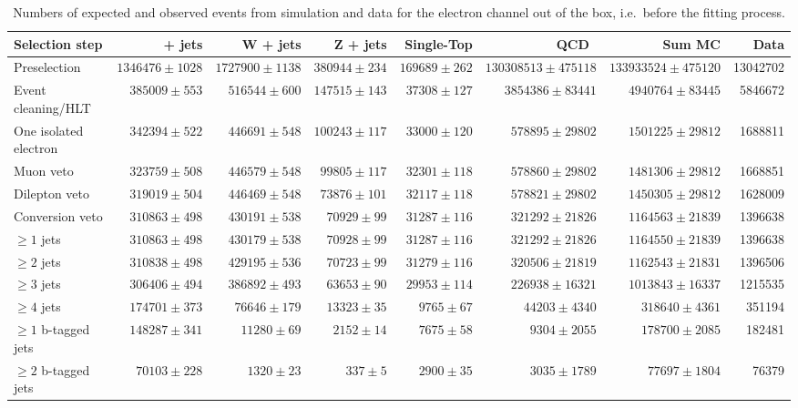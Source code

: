\begin{table}
  \centering
   \caption{Numbers of expected and observed events from simulation and data
   for the electron channel out of the box, i.e.\ before the fitting process.}
    \label{tab:event_yields_ejets}
    \resizebox{\columnwidth}{!} {
    \begin{tabular}{lrrrrrrr}
    \toprule
	Selection step & \ttbar + jets & W + jets & Z + jets & Single-Top & QCD~  & Sum MC & Data \\
	\midrule
	Preselection  &  $1346476 \pm 1028$ &  $1727900 \pm 1138$ &  $380944 \pm 234$ &  $169689 \pm 262$ &  $130308513 \pm 475118$ &  $133933524 \pm 475120$ &  13042702 \\ 
	Event cleaning/HLT  &  $385009 \pm 553$ &  $516544 \pm 600$ &  $147515 \pm 143$ &  $37308 \pm 127$ &  $3854386 \pm 83441$ &  $4940764 \pm 83445$ &  5846672 \\ 
	One isolated electron  &  $342394 \pm 522$ &  $446691 \pm 548$ &  $100243 \pm 117$ &  $33000 \pm 120$ &  $578895 \pm 29802$ &  $1501225 \pm 29812$ &  1688811 \\ 
	Muon veto  &  $323759 \pm 508$ &  $446579 \pm 548$ &  $99805 \pm 117$ &  $32301 \pm 118$ &  $578860 \pm 29802$ &  $1481306 \pm 29812$ &  1668851 \\ 
	Dilepton veto  &  $319019 \pm 504$ &  $446469 \pm 548$ &  $73876 \pm 101$ &  $32117 \pm 118$ &  $578821 \pm 29802$ &  $1450305 \pm 29812$ &  1628009 \\ 
	Conversion veto  &  $310863 \pm 498$ &  $430191 \pm 538$ &  $70929 \pm 99$ &  $31287 \pm 116$ &  $321292 \pm 21826$ &  $1164563 \pm 21839$ &  1396638 \\ 
	$\geq 1$ jets  &  $310863 \pm 498$ &  $430179 \pm 538$ &  $70928 \pm 99$ &  $31287 \pm 116$ &  $321292 \pm 21826$ &  $1164550 \pm 21839$ &  1396638 \\ 
	$\geq 2$ jets  &  $310838 \pm 498$ &  $429195 \pm 536$ &  $70723 \pm 99$ &  $31279 \pm 116$ &  $320506 \pm 21819$ &  $1162543 \pm 21831$ &  1396506 \\ 
	$\geq 3$ jets  &  $306406 \pm 494$ &  $386892 \pm 493$ &  $63653 \pm 90$ &  $29953 \pm 114$ &  $226938 \pm 16321$ &  $1013843 \pm 16337$ &  1215535 \\ 
	$\geq 4$ jets  &  $174701 \pm 373$ &  $76646 \pm 179$ &  $13323 \pm 35$ &  $9765 \pm 67$ &  $44203 \pm 4340$ &  $318640 \pm 4361$ &  351194 \\ 
	$\geq 1$ b-tagged jets  &  $148287 \pm 341$ &  $11280 \pm 69$ &  $2152 \pm 14$ &  $7675 \pm 58$ &  $9304 \pm 2055$ &  $178700 \pm 2085$ &  182481 \\ 
	$\geq 2$ b-tagged jets  &  $70103 \pm 228$ &  $1320 \pm 23$ &  $337 \pm 5$ &  $2900 \pm 35$ &  $3035 \pm 1789$ &  $77697 \pm 1804$ &  76379 \\ 
	\bottomrule
	\end{tabular}
	}
\end{table}

